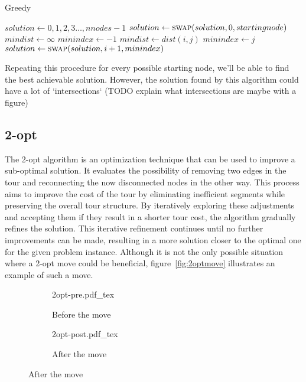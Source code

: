 \documentclass{article}
\begin{document}
\begin{algorithm}[h]
\caption{Greedy}
\label{alg:greedy}
\begin{algorithmic}

	\State $solution \gets {0, 1, 2, 3 \dots, nnodes - 1}$
	\State $solution \gets \Call{swap}{solution, 0, startingnode}$
		\State $mindist \gets \infty$
		\State $minindex \gets -1$
				\State $mindist \gets dist(i, j)$
				\State $minindex \gets j$
			\EndIf
		\EndFor
		\State $solution \gets \Call{swap}{solution, i + 1, minindex}$
    \EndFor

  \EndProcedure

\end{algorithmic}
\end{algorithm}
Repeating this procedure for every possible starting node, we'll be able to find the best
achievable solution.
However, the solution found by this algorithm could have a lot of `intersections`
(TODO explain what intersections are maybe with a figure)

\subsection{2-opt}
The 2-opt algorithm is an optimization technique that can be used to improve a sub-optimal solution.
It evaluates the possibility of removing two edges in the tour and reconnecting the now disconnected nodes in the other way.
This process aims to improve the cost of the tour by eliminating inefficient segments while preserving the overall tour structure. By
iteratively exploring these adjustments and accepting them if they result in a shorter tour cost, the algorithm gradually refines
the solution. This iterative refinement continues until no further improvements can be made, resulting in a more 
solution closer to the optimal one for the given problem instance. 
Although it is not the only possible situation where a 2-opt move could be
beneficial, figure~\ref{fig:2optmove} illustrates an example of such a move.

\begin{figure}[H]
        \caption{Example of a 2-opt move}
        \label{fig:2optmove}
        \centering
        \begin{subfigure}{.5\textwidth}
                \centering
                \def\svgwidth{.7\linewidth}
                {2opt-pre.pdf_tex}
                \caption{Before the move}
        \end{subfigure}%
        \begin{subfigure}{.5\textwidth}
                \centering
                \def\svgwidth{.7\linewidth}
                {2opt-post.pdf_tex}
                \caption{After the move}
        \end{subfigure}
\end{figure}
\end{document}
